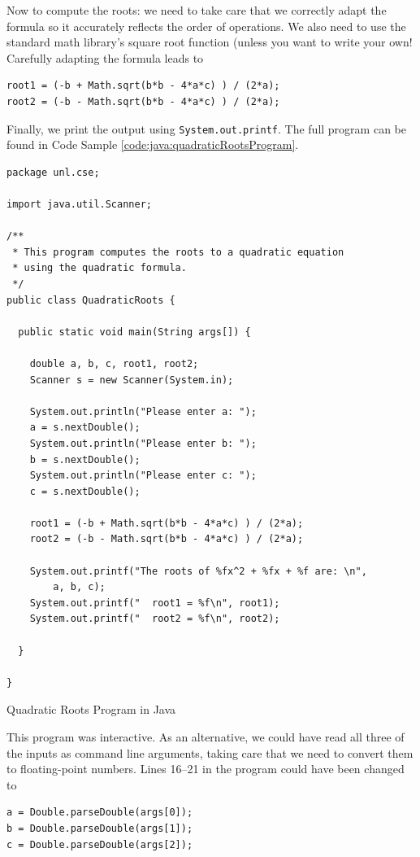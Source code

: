 Now to compute the roots: we need to take care that we correctly adapt the
formula so it accurately reflects the order of operations.  We also need to use
the standard math library's square root function (unless you want to write 
your own!  Carefully adapting the formula leads to 

\begin{verbatim}
root1 = (-b + Math.sqrt(b*b - 4*a*c) ) / (2*a);
root2 = (-b - Math.sqrt(b*b - 4*a*c) ) / (2*a);
\end{verbatim}

Finally, we print the output using \texttt{System.out.printf}.  The full program 
can be found in Code Sample \ref{code:java:quadraticRootsProgram}.

\begin{listing}[h]
\begin{verbatim}
package unl.cse;

import java.util.Scanner;

/**
 * This program computes the roots to a quadratic equation
 * using the quadratic formula.
 */
public class QuadraticRoots {

  public static void main(String args[]) {
	  
    double a, b, c, root1, root2;
    Scanner s = new Scanner(System.in);

    System.out.println("Please enter a: ");
    a = s.nextDouble();
    System.out.println("Please enter b: ");
    b = s.nextDouble();
    System.out.println("Please enter c: ");
    c = s.nextDouble();
	  
    root1 = (-b + Math.sqrt(b*b - 4*a*c) ) / (2*a);
    root2 = (-b - Math.sqrt(b*b - 4*a*c) ) / (2*a);
	  
    System.out.printf("The roots of %fx^2 + %fx + %f are: \n", 
    	a, b, c);
    System.out.printf("  root1 = %f\n", root1);
    System.out.printf("  root2 = %f\n", root2);

  }

}
\end{verbatim}
\caption{Quadratic Roots Program in Java}
\label{code:java:quadraticRootsProgram}
\end{listing}

This program was interactive.  As an alternative, we could have read 
all three of the inputs as command line arguments, taking care that we
need to convert them to floating-point numbers.  Lines 16--21 in the
program could have been changed to 

\begin{verbatim}
a = Double.parseDouble(args[0]);
b = Double.parseDouble(args[1]);
c = Double.parseDouble(args[2]);
\end{verbatim}

